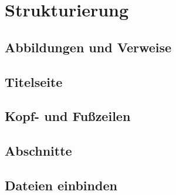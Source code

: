 
\section{Strukturierung}

\subsection{Abbildungen und Verweise}


\subsection{Titelseite}
\subsection{Kopf- und Fußzeilen}
\subsection{Abschnitte}
\subsection{Dateien einbinden}

